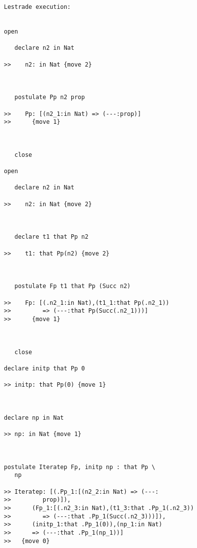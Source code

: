 \documentclass[12pt]{article}
\begin{document}
\begin{verbatim}Lestrade execution:


open

   declare n2 in Nat

>>    n2: in Nat {move 2}



   postulate Pp n2 prop

>>    Pp: [(n2_1:in Nat) => (---:prop)]
>>      {move 1}



   close

open

   declare n2 in Nat

>>    n2: in Nat {move 2}



   declare t1 that Pp n2

>>    t1: that Pp(n2) {move 2}



   postulate Fp t1 that Pp (Succ n2)

>>    Fp: [(.n2_1:in Nat),(t1_1:that Pp(.n2_1))
>>         => (---:that Pp(Succ(.n2_1)))]
>>      {move 1}



   close

declare initp that Pp 0

>> initp: that Pp(0) {move 1}



declare np in Nat

>> np: in Nat {move 1}



postulate Iteratep Fp, initp np : that Pp \
   np

>> Iteratep: [(.Pp_1:[(n2_2:in Nat) => (---:
>>         prop)]),
>>      (Fp_1:[(.n2_3:in Nat),(t1_3:that .Pp_1(.n2_3))
>>         => (---:that .Pp_1(Succ(.n2_3)))]),
>>      (initp_1:that .Pp_1(0)),(np_1:in Nat)
>>      => (---:that .Pp_1(np_1))]
>>   {move 0}


\end{verbatim}
\end{document}

